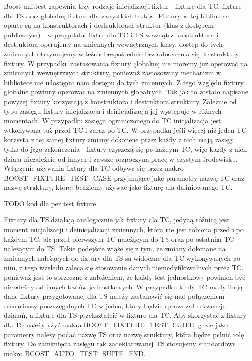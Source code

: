 \documentclass[12pt,a4paper,notitlepage]{report}
\begin{document}
Boost unittest zapewnia trzy rodzaje inicjalizacji fixtur - fixture dla TC, fixture dla TS oraz globalną fixture dla wszystkich testów. Fixtury w tej bibliotece oparte są na konstruktorach i destruktorach struktur (klas z dostępem publicznym) - w przypdaku fixtur dla TC i TS wewnątrz konstruktora i destruktora operujemy na zmiennych wewnętrznych klasy, dostęp do tych zmiennych otrzymujemy w teście bezpośrednio bez odnoszenia się do struktury fixtury.
W przypadku zastosowania fixtury globalnej nie możemy już operować na zmiennych wewnętrznych struktury, ponieważ zastosowany mechanizm w bibliotece nie udostępni nam dostępu do tych zmiennych. Z tego względu fixtury globalne powinny operować na zmiennych globalnych.
Tak jak to zostało napisane powyżej fixtury korzystają z konstruktora i destruktora struktury. Zależnie od typu zasięgu fixtury inicjalizacja i deinicjalizacja jej występuje w różnych momentach. W przypadku zasięgu ograniczonego do TC inicjalizacja jest wtkonywana tuż przed TC i zaraz po TC. W przypadku jeśli więcej niż jeden TC korzysta z tej samej fixtury zmiany dokonene przez każdy z nich mają zasięg tylko do jego zakończenia - fixtury czyszczą się po każdym TC, więc każdy z nich działa niezależnie od innych i zawsze rozpoczyna pracę w czystym środowisku.
Włączenie używania fixtury dla TC odbywa się przez makro BOOST_FIXTURE_TEST_CASE przyjmujące jako parametry nazwę TC oraz nazwę struktury, której będziemy używać jako fixturę dla dafiniowanego TC.

TODO kod dla per test fixture

Fixtury dla TS działają analogicznie jak fixtury dla TC, jedyną róźnicą jest moment inicjalizacji i deinicjalizacji zmiennych, która nie jest robiona przed i po każdym TC, ale przed pierwszym TC należącym do TS oraz po ostatnim TC należącym do TS.
Takie podejście wiąże się z tym, że zmiany dokonane na zmiennych należących do fixtury dla TS są widoczne dla TC wykonywanych po nim, z tego względu zaleca się stosowanie danych niemodyfikowalnych przez TC, ponieważ jest to sprzeczne z założeniem, że każdy test jednostkowy powinien być niezależny od innych testów jednostkowych.
W przypadku kiedy TC modyfikują dane fixtury przygotowanej dla TS należy zastanowić się nad połączeniem scenariuszy poszczególnych TC w jeden, który będzie sprawdzał sekwencje działań, a fixture dla TS przekształcić w fixture dla TC.
Aby skorzystać z fixtury dla TS należy użyć makra BOOST_FIXTURE_TEST_SUITE, gdzie jako parametry należy podać nazwę TS oraz nazwę struktury, która będze pełnić rolę fixtury. Do zamknięcia zasięgu tak zadeklarowanej TS stosujemy standardowe makro BOOST_AUTO_TEST_SUITE_END.
\end{document}
